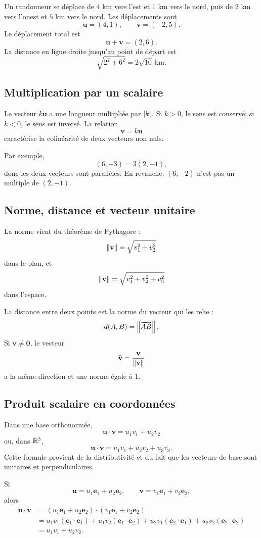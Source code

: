 \begin{examplebox}
Un randonneur se déplace de $4$ km vers l'est et $1$ km vers le nord, puis de $2$ km vers l'ouest et $5$ km vers le nord. Les déplacements sont
\[
\mathbf u=(4,1),
\qquad
\mathbf v=(-2,5).
\]
Le déplacement total est
\[
\mathbf u+\mathbf v=(2,6).
\]
La distance en ligne droite jusqu'au point de départ est
\[
\sqrt{2^2+6^2}=2\sqrt{10}\ \mathrm{km}.
\]
\end{examplebox}

\subsection{Multiplication par un scalaire}

Le vecteur $k\mathbf u$ a une longueur multipliée par $\left\lvert k\right\rvert$. Si $k>0$, le sens est conservé; si $k<0$, le sens est inversé. La relation
\[
\mathbf v=k\mathbf u
\]
caractérise la colinéarité de deux vecteurs non nuls.

Par exemple,
\[
(6,-3)=3(2,-1),
\]
donc les deux vecteurs sont parallèles. En revanche, $(6,-2)$ n'est pas un multiple de $(2,-1)$.

\subsection{Norme, distance et vecteur unitaire}

La norme vient du théorème de Pythagore :
\[
\left\lVert \mathbf v\right\rVert=\sqrt{v_1^2+v_2^2}
\]
dans le plan, et
\[
\left\lVert \mathbf v\right\rVert=\sqrt{v_1^2+v_2^2+v_3^2}
\]
dans l'espace.

La distance entre deux points est la norme du vecteur qui les relie :
\[
d(A,B)=\left\lVert \overrightarrow{AB}\right\rVert.
\]
Si $\mathbf v\neq\mathbf0$, le vecteur
\[
\widehat{\mathbf v}=\frac{\mathbf v}{\left\lVert \mathbf v\right\rVert}
\]
a la même direction et une norme égale à $1$.

\subsection{Produit scalaire en coordonnées}

Dans une base orthonormée,
\[
\mathbf u\cdot\mathbf v=u_1v_1+u_2v_2
\]
ou, dans $\mathbb{R}^3$,
\[
\mathbf u\cdot\mathbf v=u_1v_1+u_2v_2+u_3v_3.
\]
Cette formule provient de la distributivité et du fait que les vecteurs de base sont unitaires et perpendiculaires.

Si
\[
\mathbf u=u_1\mathbf e_1+u_2\mathbf e_2,
\qquad
\mathbf v=v_1\mathbf e_1+v_2\mathbf e_2,
\]
alors
\begin{align*}
\mathbf u\cdot\mathbf v
&=(u_1\mathbf e_1+u_2\mathbf e_2)\cdot(v_1\mathbf e_1+v_2\mathbf e_2)\\
&=u_1v_1(\mathbf e_1\cdot\mathbf e_1)
+u_1v_2(\mathbf e_1\cdot\mathbf e_2)
+u_2v_1(\mathbf e_2\cdot\mathbf e_1)
+u_2v_2(\mathbf e_2\cdot\mathbf e_2)\\
&=u_1v_1+u_2v_2.
\end{align*}

